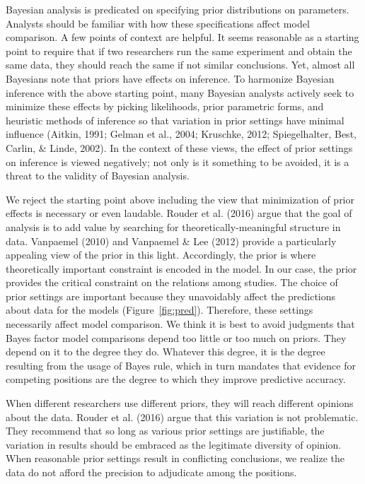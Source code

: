 \documentclass[english,man]{apa6}
\theoremstyle{definition}
\theoremstyle{definition}
\theoremstyle{remark}
\begin{document}
Bayesian analysis is predicated on specifying prior distributions on
parameters. Analysts should be familiar with how these specifications
affect model comparison. A few points of context are helpful. It seems
reasonable as a starting point to require that if two researchers run
the same experiment and obtain the same data, they should reach the same
if not similar conclusions. Yet, almost all Bayesians note that priors
have effects on inference. To harmonize Bayesian inference with the
above starting point, many Bayesian analysts actively seek to minimize
these effects by picking likelihoods, prior parametric forms, and
heuristic methods of inference so that variation in prior settings have
minimal influence (Aitkin, 1991; Gelman et al., 2004; Kruschke, 2012;
Spiegelhalter, Best, Carlin, \& Linde, 2002). In the context of these
views, the effect of prior settings on inference is viewed negatively;
not only is it something to be avoided, it is a threat to the validity
of Bayesian analysis.

We reject the starting point above including the view that minimization
of prior effects is necessary or even laudable. Rouder et al. (2016)
argue that the goal of analysis is to add value by searching for
theoretically-meaningful structure in data. Vanpaemel (2010) and
Vanpaemel \& Lee (2012) provide a particularly appealing view of the
prior in this light. Accordingly, the prior is where theoretically
important constraint is encoded in the model. In our case, the prior
provides the critical constraint on the relations among studies. The
choice of prior settings are important because they unavoidably affect
the predictions about data for the models (Figure~\ref{fig:pred}).
Therefore, these settings necessarily affect model comparison. We think
it is best to avoid judgments that Bayes factor model comparisons depend
too little or too much on priors. They depend on it to the degree they
do. Whatever this degree, it is the degree resulting from the usage of
Bayes rule, which in turn mandates that evidence for competing positions
are the degree to which they improve predictive accuracy.

When different researchers use different priors, they will reach
different opinions about the data. Rouder et al. (2016) argue that this
variation is not problematic. They recommend that so long as various
prior settings are justifiable, the variation in results should be
embraced as the legitimate diversity of opinion. When reasonable prior
settings result in conflicting conclusions, we realize the data do not
afford the precision to adjudicate among the positions.
\end{document}
